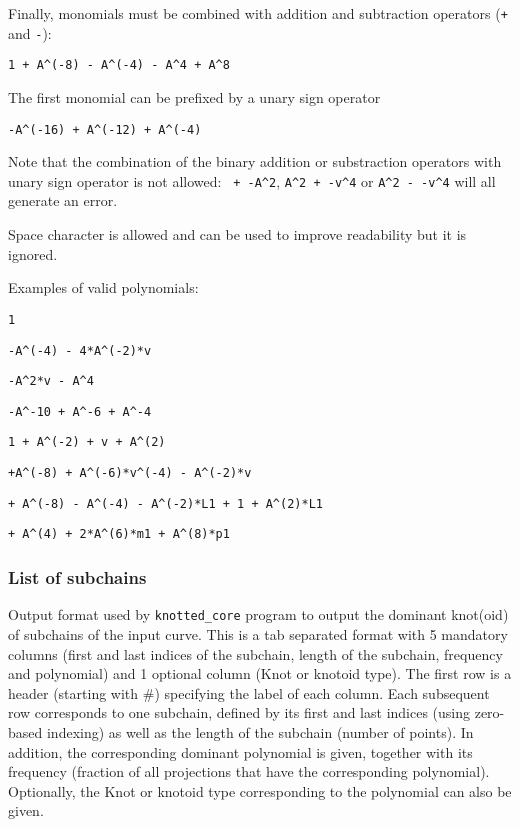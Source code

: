 Finally, monomials must be combined with addition and subtraction operators (\lstinline{+} and \lstinline{-}):
\begin{lstlisting}
1 + A^(-8) - A^(-4) - A^4 + A^8
\end{lstlisting}
The first monomial can be prefixed by a unary sign operator
\begin{lstlisting}
-A^(-16) + A^(-12) + A^(-4)
\end{lstlisting}
Note that the combination of the binary addition or substraction operators with unary sign operator is not allowed: \lstinline{ + -A^2}, \lstinline{A^2 + -v^4} or \lstinline{A^2 - -v^4} will all generate an error.

Space character is allowed and can be used to improve readability but it is ignored.

Examples of valid polynomials:
\begin{lstlisting}
1
\end{lstlisting}
\begin{lstlisting}
-A^(-4) - 4*A^(-2)*v
\end{lstlisting}
\begin{lstlisting}
-A^2*v - A^4
\end{lstlisting}
\begin{lstlisting}
-A^-10 + A^-6 + A^-4
\end{lstlisting}
\begin{lstlisting}
1 + A^(-2) + v + A^(2)
\end{lstlisting}
\begin{lstlisting}
+A^(-8) + A^(-6)*v^(-4) - A^(-2)*v
\end{lstlisting}
\begin{lstlisting}
+ A^(-8) - A^(-4) - A^(-2)*L1 + 1 + A^(2)*L1
\end{lstlisting}
\begin{lstlisting}
+ A^(4) + 2*A^(6)*m1 + A^(8)*p1
\end{lstlisting}
  
\subsubsection{\label{sec:format:listsubchains}List of subchains}
Output format used by \lstinline{knotted_core} program to output the dominant knot(oid) of subchains of the input curve.
This is a tab separated format with 5 mandatory columns (first and last indices of the subchain, length of the subchain, frequency and polynomial)  and 1 optional column (Knot or knotoid type).
The first row is a header (starting with \#) specifying the label of each column.
Each subsequent row corresponds to one subchain, defined by its first and last indices (using zero-based indexing) as well as the length of the subchain (number of points). In addition, the corresponding dominant polynomial is given, together with its frequency (fraction of all projections that have the corresponding polynomial). Optionally, the Knot or knotoid type corresponding to the polynomial can also be given.


